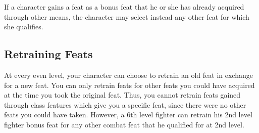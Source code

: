If a character gains a feat as a bonus feat that he or she has already acquired through other means, the character may select instead any other feat for which she qualifies.

\subsection{Retraining Feats}
At every even level, your character can choose to retrain an old feat in exchange for a new feat.
You can only retrain feats for other feats you could have acquired at the time you took the original feat.
Thus, you cannot retrain feats gained through class features which give you a specific feat, since there were no other feats you could have taken.
However, a 6th level fighter can retrain his 2nd level fighter bonus feat for any other combat feat that he qualified for at 2nd level.
